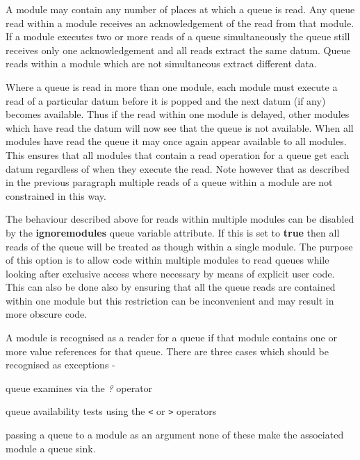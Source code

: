             A module may contain any number of places at which a queue is read.
            Any queue read within a module receives an acknowledgement of the
            read from that module. If a module executes two or more reads of a
            queue simultaneously the queue still receives only one acknowledgement
            and all reads extract the same datum. Queue reads within a module
            which are not simultaneous extract different data.

            Where a queue is read in more than one module, each module must
            execute a read of a particular datum before it is popped and the
            next datum (if any) becomes available. Thus if the read within one
            module is delayed, other modules which have read the datum will now
            see that the queue is not available. When all modules have read the
            queue it may once again appear available to all modules. This ensures
            that all modules that contain a read operation for a queue get each
            datum regardless of when they execute the read. Note however that as
            described in the previous paragraph multiple reads of a queue within
            a module are not constrained in this way.
            
            The behaviour described above for reads within multiple modules can
            be disabled by the {\bf ignoremodules} queue variable attribute. If
            this is set to {\bf true} then all reads of the queue will be treated
            as though within a single module. The purpose of this option is to
            allow code within multiple modules to read queues while looking after
            exclusive access where necessary by means of explicit user code.
            This can also be done also by ensuring that all the queue reads are
            contained within one module but this restriction can be inconvenient
            and may result in more obscure code.
            
            
            A module is recognised as a reader for a queue if that module
            contains one or more value references for that queue. There are three
            cases which should be recognised as exceptions -
            \blist
            \item   queue examines via the {\em ?} operator
            \item   queue availability tests using the {\em \verb'<'}
                    or {\em \verb'>'} operators
            \item   passing a queue to a module as an argument
            \blend
            none of these make the associated module a queue sink.
            
